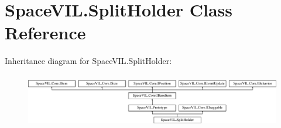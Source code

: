 \hypertarget{class_space_v_i_l_1_1_split_holder}{}\section{Space\+V\+I\+L.\+Split\+Holder Class Reference}
\label{class_space_v_i_l_1_1_split_holder}
Inheritance diagram for Space\+V\+I\+L.\+Split\+Holder\+:\begin{figure}[H]
\begin{center}
\leavevmode
\includegraphics[height=2.421622cm]{class_space_v_i_l_1_1_split_holder}
\end{center}
\end{figure}
